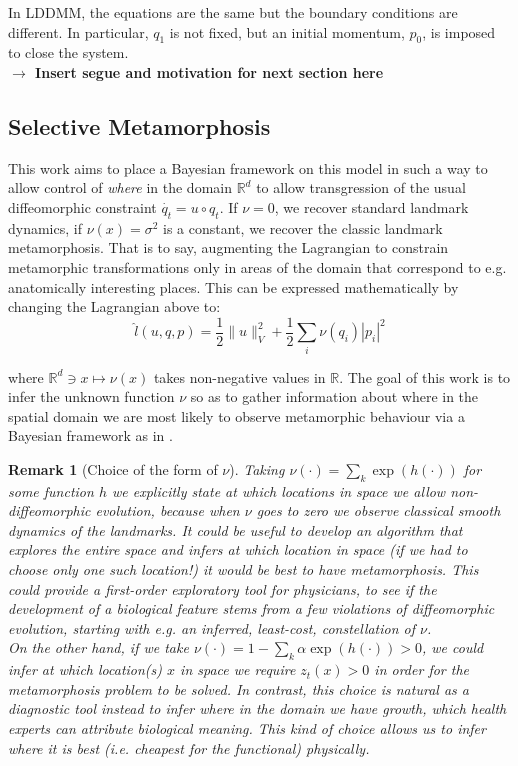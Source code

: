 \documentclass{article}
\newtheorem{remark}{Remark}
\newcommand{\half}{\frac 12}
\newcommand{\norm}[2]{\| #1 \|_{ #2 }}
\newcommand{\vnorm}[1]{\norm{ #1 }{V}}
\newcommand{\Rd}{\mathbb{R}^{d}}
\begin{document}
In LDDMM, the equations are the same but the boundary conditions are different.
In particular, $q_1$ is not fixed, but an initial momentum, $p_0$, is imposed to
close the system.\\

\textbf{$\longrightarrow$ Insert segue and motivation for next section here}

\subsection{Selective Metamorphosis}\label{sec:select_mm}

This work aims to place a Bayesian framework on this model in such a way to
allow control of \emph{where} in the domain $\Rd$ to allow transgression of the
usual diffeomorphic constraint $\dot{q_t} = u\circ q_t$. If $\nu=0$, we recover
standard landmark dynamics, if $\nu(x)=\sigma^2$ is a constant, we recover the
classic landmark metamorphosis. That is to say, augmenting the Lagrangian to
constrain metamorphic transformations only in areas of the domain that
correspond to e.g. anatomically interesting places.  This can be expressed
mathematically by changing the Lagrangian above to:
\[
\hat l(u, q, p) = \half\vnorm{u}^2 + \half\sum_i \nu(q_i)|p_i|^2
\]

where $\Rd\ni x\mapsto\nu (x)$ takes non-negative values in $\mathbb R$. The
goal of this work is to infer the unknown function $\nu$ so as to gather
information about where in the spatial domain we are most likely to observe
metamorphic behaviour via a Bayesian framework as in \cite{dashti2017bayesian}.

\begin{remark}[Choice of the form of $\nu$]
Taking $\nu(\cdot) = \sum_k \exp(h(\cdot))$ for some function $h$ we explicitly
state at which locations in space we allow non-diffeomorphic evolution, because
when $\nu$ goes to zero we observe classical smooth dynamics of the landmarks.
It could be useful to develop an algorithm that explores the entire space and
infers at which location in space (if we had to choose only one such location!)
it would be best to have metamorphosis. This could provide a first-order
exploratory tool for physicians, to see if the development of a biological
feature stems from a few violations of diffeomorphic evolution, starting with
e.g. an inferred, least-cost, constellation of $\nu$.\\

On the other hand, if we take $\nu(\cdot) = 1 - \sum_k \alpha \exp(h(\cdot))>0$,
we could infer at which location(s) $x$ in space we require $z_t(x)>0$ in order
for the metamorphosis problem to be solved. In contrast, this choice is natural
as a diagnostic tool instead to infer where in the domain we have growth, which
health experts can attribute biological meaning. This kind of choice allows us
to infer where it is best (i.e. cheapest for the functional) \emph{physically}.
\end{remark}
\end{document}
